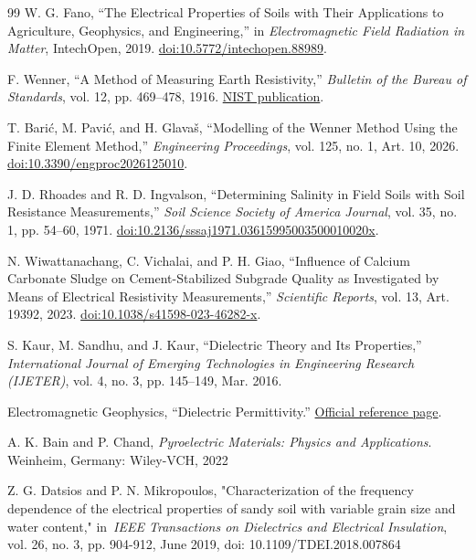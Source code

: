 \begin{thebibliography}{99}
W. G. Fano, ``The Electrical Properties of Soils with Their
Applications to Agriculture, Geophysics, and Engineering,'' in
\emph{Electromagnetic Field Radiation in Matter}, IntechOpen, 2019.
\href{https://doi.org/10.5772/intechopen.88989}{doi:10.5772/intechopen.88989}.

F. Wenner, ``A Method of Measuring Earth Resistivity,''
\emph{Bulletin of the Bureau of Standards}, vol. 12, pp. 469--478, 1916.
\href{https://nvlpubs.nist.gov/nistpubs/bulletin/12/nbsbulletinv12n4p469_A2b.pdf}{NIST
publication}.

T. Barić, M. Pavić, and H. Glavaš, ``Modelling of the Wenner
Method Using the Finite Element Method,'' \emph{Engineering
Proceedings}, vol. 125, no. 1, Art. 10, 2026.
\href{https://doi.org/10.3390/engproc2026125010}{doi:10.3390/engproc2026125010}.

J. D. Rhoades and R. D. Ingvalson, ``Determining Salinity in
Field Soils with Soil Resistance Measurements,'' \emph{Soil Science
Society of America Journal}, vol. 35, no. 1, pp. 54--60, 1971.
\href{https://doi.org/10.2136/sssaj1971.03615995003500010020x}{doi:10.2136/sssaj1971.03615995003500010020x}.

N. Wiwattanachang, C. Vichalai, and P. H. Giao, ``Influence of
Calcium Carbonate Sludge on Cement-Stabilized Subgrade Quality as
Investigated by Means of Electrical Resistivity Measurements,''
\emph{Scientific Reports}, vol. 13, Art. 19392, 2023.
\href{https://doi.org/10.1038/s41598-023-46282-x}{doi:10.1038/s41598-023-46282-x}.

S. Kaur, M. Sandhu, and J. Kaur, ``Dielectric Theory and Its
Properties,'' \emph{International Journal of Emerging Technologies in
Engineering Research (IJETER)}, vol. 4, no. 3, pp. 145--149, Mar. 2016.

Electromagnetic Geophysics, ``Dielectric Permittivity.''
\href{https://em.geosci.xyz/content/physical_properties/dielectric_permittivity/index.html}{Official
reference page}.

A. K. Bain and P. Chand, \emph{Pyroelectric Materials: Physics
and Applications}. Weinheim, Germany: Wiley-VCH, 2022

Z. G. Datsios and P. N. Mikropoulos, "Characterization of the
frequency dependence of the electrical properties of sandy soil with
variable grain size and water content," in~\emph{IEEE Transactions on
Dielectrics and Electrical Insulation}, vol. 26, no. 3, pp. 904-912,
June 2019, doi: 10.1109/TDEI.2018.007864


\end{thebibliography}
